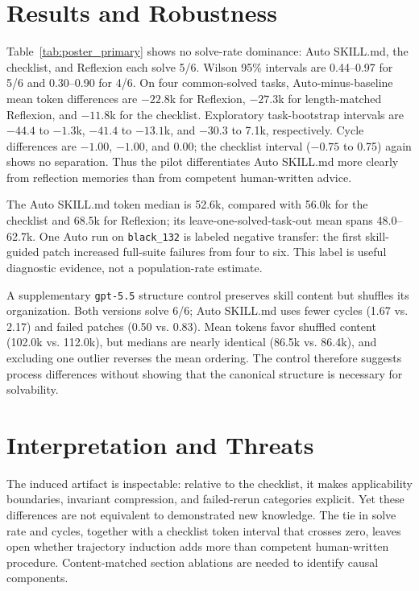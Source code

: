 \documentclass[sigconf,screen,pbalance]{acmart}
\begin{document}
\section{Results and Robustness}
Table~\ref{tab:poster_primary} shows no solve-rate dominance: Auto SKILL.md,
the checklist, and Reflexion each solve 5/6. Wilson 95\% intervals are
0.44--0.97 for 5/6 and 0.30--0.90 for 4/6. On four common-solved tasks,
Auto-minus-baseline mean token differences are $-22.8$k for Reflexion,
$-27.3$k for length-matched Reflexion, and $-11.8$k for the checklist.
Exploratory task-bootstrap intervals are $-44.4$ to $-1.3$k, $-41.4$ to
$-13.1$k, and $-30.3$ to 7.1k, respectively. Cycle differences are $-1.00$,
$-1.00$, and 0.00; the checklist interval ($-0.75$ to 0.75) again shows no
separation. Thus the pilot differentiates Auto SKILL.md more clearly from
reflection memories than from competent human-written advice.

The Auto SKILL.md token median is 52.6k, compared with 56.0k for the checklist
and 68.5k for Reflexion; its leave-one-solved-task-out mean spans 48.0--62.7k.
One Auto run on \texttt{black\_132} is labeled negative transfer: the first
skill-guided patch increased full-suite failures from four to six. This label
is useful diagnostic evidence, not a population-rate estimate.

A supplementary \texttt{gpt-5.5} structure control preserves skill content
but shuffles its organization. Both versions solve 6/6; Auto SKILL.md uses
fewer cycles (1.67 vs. 2.17) and failed patches (0.50 vs. 0.83). Mean tokens
favor shuffled content (102.0k vs. 112.0k), but medians are nearly identical
(86.5k vs. 86.4k), and excluding one outlier reverses the mean ordering. The
control therefore suggests process differences without showing that the
canonical structure is necessary for solvability.

\section{Interpretation and Threats}
The induced artifact is inspectable: relative to the checklist, it makes
applicability boundaries, invariant compression, and failed-rerun categories
explicit. Yet these differences are not equivalent to demonstrated new
knowledge. The tie in solve rate and cycles, together with a checklist token
interval that crosses zero, leaves open whether trajectory induction adds more
than competent human-written procedure. Content-matched section ablations are
needed to identify causal components.
\end{document}
